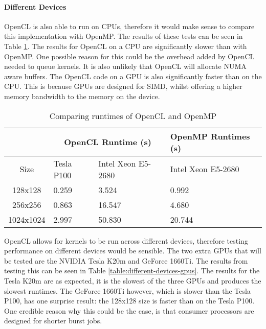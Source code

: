 


\paragraph{Different Devices}
OpenCL is also able to run on CPUs, therefore it would make sense to compare this implementation with OpenMP. The results of these tests can be seen in Table \ref{table:opencl-openmp}. The results for OpenCL on a CPU are significantly slower than with OpenMP. One possible reason for this could be the overhead added by OpenCL needed to queue kernels. It is also unlikely that OpenCL will allocate NUMA aware buffers. The OpenCL code on a GPU is also significantly faster than on the CPU. This is because GPUs are designed for SIMD, whilst offering a higher memory bandwidth to the memory on the device. 

\begin{table}[ht]
\vspace{-5mm}
\centering
\caption{Comparing runtimes of OpenCL and OpenMP}
\vspace{1mm}
\begin{tabular}{|c||p{3.5em}|p{5em}|p{6.3em}|}
    \hline
    & \multicolumn{2}{|c|}{OpenCL Runtime (s)} & OpenMP Runtimes (s) \\
    \hline
    Size & Tesla P100 & Intel Xeon E5-2680 & Intel Xeon E5-2680 \\
    \hline
    128x128 & 0.259 & 3.524 & 0.992 \\
    \hline
    256x256 & 0.863 & 16.547 & 4.680 \\
    \hline
    1024x1024 & 2.997 & 50.830 & 20.744 \\
    \hline
\end{tabular}
\label{table:opencl-openmp}
\vspace{-3mm}
\end{table}


OpenCL allows for kernels to be run across different devices, therefore testing performance on different devices would be sensible. The two extra GPUs that will be tested are the NVIDIA Tesla K20m and GeForce 1660Ti. The results from testing this can be seen in Table \ref{table:different-devices-gpus}. The results for the Tesla K20m are as expected, it is the slowest of the three GPUs and produces the slowest runtimes. The GeForce 1660Ti however, which is slower than the Tesla P100, has one surprise result: the 128x128 size is faster than on the Tesla P100. One credible reason why this could be the case, is that consumer processors are designed for shorter burst jobs.


